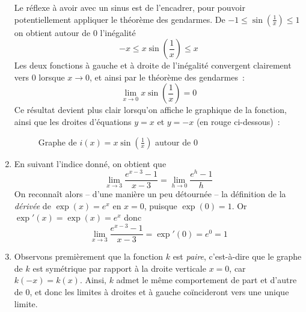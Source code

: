 \begin{exercice}
\begin{enumerate}
    Le réflexe à avoir avec un sinus est de l'encadrer, pour pouvoir potentiellement appliquer le théorème des gendarmes. De $-1 \leq \sin\left(\frac{1}{x}\right) \leq 1$ on obtient autour de $0$ l'inégalité
    \[
    -x \leq x \sin\left(\frac{1}{x}\right) \leq x
    \]
    Les deux fonctions à gauche et à droite de l'inégalité convergent clairement vers $0$ lorsque $x \to 0$, et ainsi par le théorème des gendarmes~:
    \[
    \lim_{x \to 0} x \sin\left(\frac{1}{x}\right) = 0
    \]
    Ce résultat devient plus clair lorsqu'on affiche le graphique de la fonction, ainsi que les droites d'équations $y = x$ et $y = -x$ (en rouge ci-dessous)~:
    \begin{figure}[H]
    \centering
    \caption{Graphe de $i(x) = x \sin\left(\frac{1}{x}\right)$ autour de $0$}
    \label{fig:i_graph}
\end{figure}
    
    
    \item En suivant l'indice donné, on obtient que
    \[
    \lim_{x \to 3} \frac{e^{x-3}-1}{x-3} = \lim_{h \to 0} \frac{e^h - 1}{h}
    \]
    On reconnaît alors -- d'une manière un peu détournée -- la définition de la \emph{dérivée} de $\exp(x) = e^x$ en $x = 0$, puisque $\exp(0) = 1$. Or $\exp'(x) = \exp(x) = e^x$ donc
    \[
    \lim_{x \to 3} \frac{e^{x-3} - 1}{x-3} = \exp'(0) = e^0 = 1
    \]
    
    \item Observons premièrement que la fonction $k$ est \emph{paire}, c'est-à-dire que le graphe de $k$ est symétrique par rapport à la droite verticale $x = 0$, car $k(-x) = k(x)$. Ainsi, $k$ admet le même comportement de part et d'autre de $0$, et donc les limites à droites et à gauche coïncideront vers une unique limite.
    

\end{enumerate}
\end{exercice}
